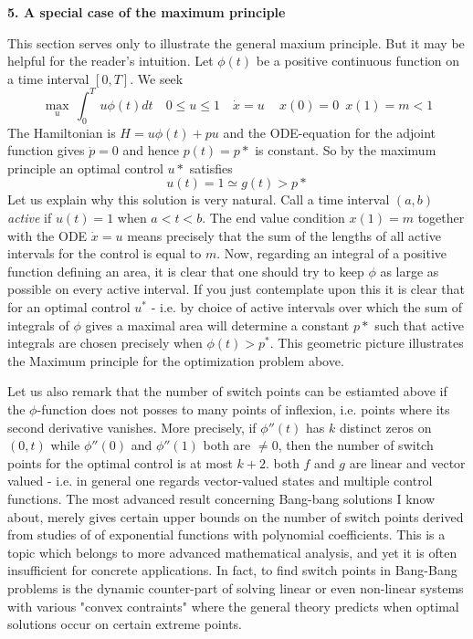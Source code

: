 \documentclass{amsart}
\begin{document}
\newpage








\centerline{\bf\large 5. A special case of the maximum principle}

\bigskip 
\noindent
This section serves only to illustrate the general maxium principle. But it may be helpful for the reader's intuition.
Let $\phi(t)$ be a positive continuous function on a time interval $[0,T]$. We seek
\begin{equation*}
\max_u\,\int_0^T\, u\phi(t)dt\quad 0\leq u\leq 1\quad \dot x=u\quad\, 
x(0)=0\,\,\,x(1)=m<1
\end{equation*}
\medskip 
The Hamiltonian is $H=u\phi(t)+pu$ and the ODE-equation for the adjoint function
gives $\dot p=0$ and hence $p(t)=p*$ is constant.
So by the maximum principle an optimal control $u*$ satisfies
\begin{equation*}
u(t)=1 \simeq g(t)>p*
\end{equation*}
\medskip \noindent 
Let us explain why this solution is very natural. Call a time interval 
$(a,b)$ {\it{active}} if $u(t)=1$ when $a<t<b$.
The end value condition $x(1)=m$ together with the ODE
$\dot x=u$ means precisely that the sum of the lengths of all active intervals for the control is equal to $m$.
Now, regarding an integral of a positive function defining an area, 
it is clear that one should try to keep $\phi$ as large 
as possible on every active interval.
If you just contemplate upon this it is clear that for an optimal control $u^*$ - i.e. by 
choice of active intervals over which the sum of integrals of $\phi$ gives a maximal area will determine a constant $p*$ such that
active integrals are chosen precisely when $\phi(t)>p^\ast$.
This geometric picture illustrates the Maximum principle for
the  optimization problem above. 
\medskip

\noindent
Let us also remark that the number of switch points can be estiamted above if the $\phi$-function does 
not posses to many points of inflexion, i.e. points where its second derivative vanishes. More precisely, if
$\phi''(t)$ has $k$ distinct zeros on $(0,t)$ while $\phi''(0)$ and 
$\phi''(1)$ both are 
$\neq 0$, then the number of switch points for the optimal control is at most
$k+2$.
both $f$ and $g$ are linear and 
vector valued - i.e. in general one regards
vector-valued states and multiple control functions. The 
most advanced  result concerning Bang-bang solutions
I know about, merely gives certain
upper bounds
on the number of switch points derived from studies of
of 
exponential functions with polynomial coefficients.
This is a topic which belongs to more advanced mathematical analysis, and yet
it is often insufficient
for concrete applications.
In fact, to find switch points in Bang-Bang problems is the dynamic counter-part of
solving linear or even non-linear systems with various "convex contraints"
where the general theory predicts when  optimal solutions occur on certain extreme points.
\end{document}

